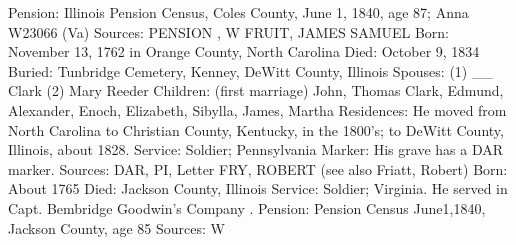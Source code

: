 Pension: Illinois Pension Census, Coles County, June 1, 1840, age 87; Anna W23066 (Va) 
Sources: PENSION , W 
FRUIT, JAMES SAMUEL 
Born: November 13, 1762 in Orange County, North Carolina 
Died: October 9, 1834 
Buried: Tunbridge Cemetery, Kenney, DeWitt County, Illinois 
Spouses: (1) __ Clark
		 (2) Mary Reeder 
Children: (first marriage) John, Thomas Clark, Edmund, Alexander, Enoch, Elizabeth, Sibylla, James, Martha 
Residences: He moved from North Carolina to Christian County, Kentucky, in the 1800's; to DeWitt County, Illinois, about 1828. 
Service: Soldier; Pennsylvania 
Marker: His grave has a DAR marker. 
Sources: DAR, PI, Letter 
FRY, ROBERT (see also Friatt, Robert) 
Born: About 1765 
Died: Jackson County, Illinois 
Service: Soldier; Virginia. He served in Capt. Bembridge Goodwin's Company . 
Pension: Pension Census June1,1840, Jackson County, age 85 
Sources: W 

